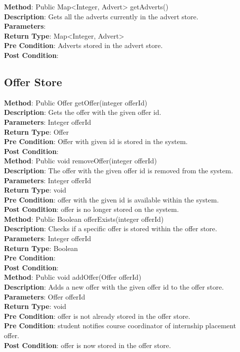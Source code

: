 \documentclass{l3deliverable}
\begin{document}
\textbf{Method}: Public Map<Integer, Advert> getAdverts()\\
\textbf{Description}: Gets all the adverts currently in the advert store. \\
\textbf{Parameters}: \\
\textbf{Return Type}: Map<Integer, Advert>\\
\textbf{Pre Condition}: Adverts stored in the advert store.\\
\textbf{Post Condition}: \\

\subsection{Offer Store}

\textbf{Method}: Public Offer getOffer(integer offerId)\\ 
\textbf{Description}: Gets the offer with the given offer id. \\
\textbf{Parameters}: Integer offerId\\
\textbf{Return Type}: Offer\\
\textbf{Pre Condition}: Offer with given id is stored in the system.\\
\textbf{Post Condition}:\\

\textbf{Method}: Public void removeOffer(integer offerId)\\
\textbf{Description}: The offer with the given offer id is removed from the system. \\
\textbf{Parameters}: Integer offerId \\
\textbf{Return Type}: void\\
\textbf{Pre Condition}: offer with the given id is available within the system.\\
\textbf{Post Condition}: offer is no longer stored on the system.\\

\textbf{Method}: Public Boolean offerExists(integer offerId) \\
\textbf{Description}: Checks if a specific offer is stored within the offer store. \\
\textbf{Parameters}: Integer offerId\\
\textbf{Return Type}: Boolean\\
\textbf{Pre Condition}:\\
\textbf{Post Condition}:\\

\textbf{Method}: Public void addOffer(Offer offerId)\\
\textbf{Description}: Adds a new offer with the given offer id to the offer store. \\
\textbf{Parameters}: Offer offerId\\
\textbf{Return Type}: void\\
\textbf{Pre Condition}: offer is not already stored in the offer store.\\
\textbf{Pre Condition}: student notifies course coordinator of internship placement offer.\\
\textbf{Post Condition}: offer is now stored in the offer store.\\
\end{document}
